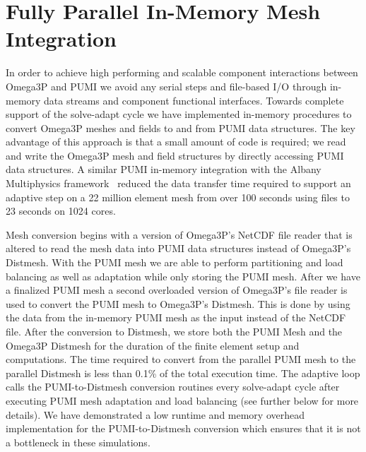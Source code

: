 \documentclass[review,12pt]{elsarticle_summary_report}
\begin{document}
\section{\label{in_memory}Fully Parallel In-Memory Mesh Integration}
In order to achieve high performing and scalable component interactions between
Omega3P and PUMI we avoid any serial steps and file-based I/O through in-memory data streams and component functional
interfaces. Towards complete support of the solve-adapt cycle we have implemented in-memory
procedures to convert Omega3P meshes and fields to and from  PUMI data structures.
The key advantage of this approach is that a small amount of code is 
required; we read and write the Omega3P mesh and field
structures by directly accessing PUMI data structures.
A similar PUMI in-memory integration with the Albany Multiphysics
framework~\cite{Albany2015,salinger2013albany} reduced the data transfer time
required to support an adaptive step on a 22 million element mesh from over 100
seconds using files to 23 seconds on 1024 cores.

Mesh conversion begins with a version of Omega3P's NetCDF file reader that is altered
to read the mesh data into PUMI data structures instead of Omega3P's Distmesh. With 
the PUMI mesh we are able to perform partitioning and load balancing as well as adaptation 
while only storing the PUMI mesh. After we have a finalized PUMI mesh a second 
overloaded version of Omega3P's file reader is used to convert the PUMI mesh to 
Omega3P's Distmesh. This is done by using the data from the in-memory PUMI mesh as the 
input instead of the NetCDF file. After the conversion to Distmesh, we store both the
PUMI Mesh and the Omega3P Distmesh for the duration of the finite element setup and 
computations. The time required to convert from the parallel PUMI mesh to the
parallel Distmesh is less than 0.1\% of the total execution time.
The adaptive loop calls the PUMI-to-Distmesh conversion routines every
solve-adapt cycle after executing PUMI mesh adaptation and load balancing (see further below for more details).
We have demonstrated a low runtime and memory overhead implementation for the
PUMI-to-Distmesh conversion which ensures that it is not a bottleneck
in these simulations.
\end{document}
